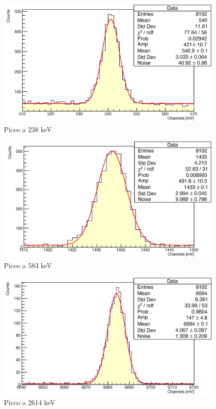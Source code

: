 \documentclass[a4paper,10pt]{article}
\begin{document}
\begin{figure}[H]
    \centering
    \includegraphics[scale=0.45]{appendice/spettri/ThPb1_21}
    \caption{Picco a 238 keV}
\end{figure}
\begin{figure}[H]
    \centering
    \includegraphics[scale=0.45]{appendice/spettri/ThPb2_21}
    \caption{Picco a 583 keV}
\end{figure}
\begin{figure}[H]
    \centering
    \includegraphics[scale=0.45]{appendice/spettri/ThPb3_21}
    \caption{Picco a 2614 keV}
\end{figure}
\end{document}
